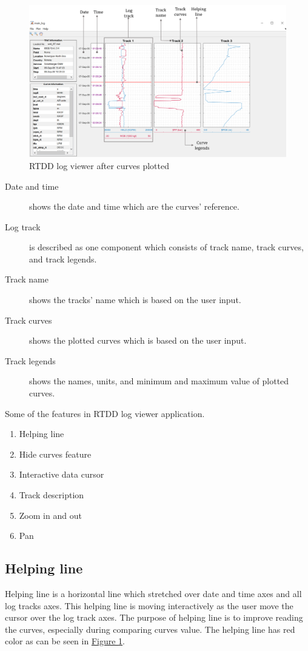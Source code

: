 \documentclass[12pt,a4paper,oneside]{report}
\begin{document}
\begin{figure}[ht]
\centering
\includegraphics[width=\textwidth]{fig/win_w_curves.png}
\caption{RTDD log viewer after curves plotted}
\label{fig:win_w_curves}
\end{figure}

\begin{description}
\item[Date and time] shows the date and time which are the curves' reference.
\item[Log track] is described as one component which consists of track name, track curves, and track legends.
\item[Track name] shows the tracks' name which is based on the user input.
\item[Track curves] shows the plotted curves which is based on the user input.
\item[Track legends] shows the names, units, and minimum and maximum value of plotted curves.
\end{description}

\noindent Some of the features in RTDD log viewer application.
\begin{enumerate}
\setlength\itemsep{0.1em}
\item{Helping line}
\item{Hide curves feature}
\item{Interactive data cursor}
\item{Track description}
\item{Zoom in and out}
\item{Pan}
\end{enumerate}

\subsection{Helping line}
Helping line is a horizontal line which stretched over date and time axes and all log tracks axes. This helping line is moving interactively as the user move the cursor over the log track axes. The purpose of helping line is to improve reading the curves, especially during comparing curves value. The helping line has red color as can be seen in \hyperref[fig:win_w_curves]{Figure \ref{fig:win_w_curves}}.
\end{document}
